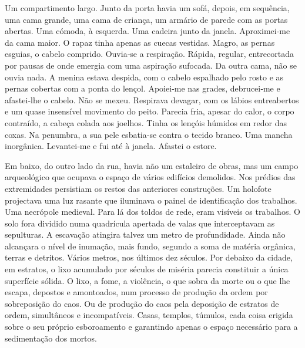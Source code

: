 Um compartimento largo. Junto da porta havia um sofá, depois, em
sequência, uma cama grande, uma cama de criança, um armário de parede
com as portas abertas. Uma cómoda, à esquerda. Uma cadeira junto da
janela. Aproximei­‑me da cama maior. O rapaz tinha apenas as cuecas
vestidas. Magro, as pernas esguias, o cabelo comprido. Ouvia­‑se a
respiração. Rápida, regular, entrecortada por pausas de onde emergia com
uma aspiração sufocada. Da outra cama, não se ouvia nada. A menina
estava despida, com o cabelo espalhado pelo rosto e as pernas cobertas
com a ponta do lençol. Apoiei­‑me nas grades, debrucei­‑me e
afastei­‑lhe o cabelo. Não se mexeu. Respirava devagar, com os lábios
entreabertos e um quase insensível movimento do peito. Parecia fria,
apesar do calor, o corpo contraído, a cabeça colada aos joelhos. Tinha
os lençóis húmidos em redor das coxas. Na penumbra, a sua pele
esbatia­‑se contra o tecido branco. Uma mancha inorgânica. Levantei­‑me
e fui até à janela. Afastei o estore.

Em baixo, do outro lado da rua, havia não um estaleiro de obras, mas um
campo arqueológico que ocupava o espaço de vários edifícios demolidos.
Nos prédios das extremidades persistiam os restos das anteriores
construções. Um holofote projectava uma luz rasante que iluminava o
painel de identificação dos trabalhos. Uma necrópole medieval. Para lá
dos toldos de rede, eram visíveis os trabalhos. O solo fora dividido
numa quadrícula apertada de valas que interceptavam as sepulturas. A
escavação atingira talvez um metro de profundidade. Ainda não alcançara
o nível de inumação, mais fundo, segundo a soma de matéria orgânica,
terras e detritos. Vários metros, nos últimos dez séculos. Por debaixo
da cidade, em estratos, o lixo acumulado por séculos de miséria parecia
constituir a única superfície sólida. O lixo, a fome, a violência, o que
sobra da morte ou o que lhe escapa, depostos e amontoados, num processo
de produção da ordem por sobreposição do caos. Ou de produção do caos
pela deposição de estratos de ordem, simultâneos e incompatíveis. Casas,
templos, túmulos, cada coisa erigida sobre o seu próprio esboroamento e
garantindo apenas o espaço necessário para a sedimentação dos mortos.

